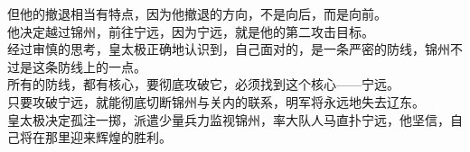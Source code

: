 \begin{multicols}{\theparacolNo}
但他的撤退相当有特点，因为他撤退的方向，不是向后，而是向前。\\

他决定越过锦州，前往宁远，因为宁远，就是他的第二攻击目标。\\

经过审慎的思考，皇太极正确地认识到，自己面对的，是一条严密的防线，锦州不过是这条防线上的一点。\\

所有的防线，都有核心，要彻底攻破它，必须找到这个核心——宁远。\\

只要攻破宁远，就能彻底切断锦州与关内的联系，明军将永远地失去辽东。\\

皇太极决定孤注一掷，派遣少量兵力监视锦州，率大队人马直扑宁远，他坚信，自己将在那里迎来辉煌的胜利。\\
\ifnum{}
	\end{multicols}
\fi
\newpage
